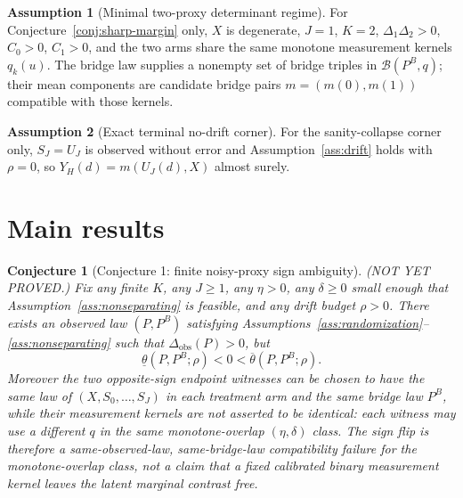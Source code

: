 \documentclass[11pt]{article}
\theoremstyle{definition}
\newtheorem{assumption}{Assumption}
\theoremstyle{plain}
\newtheorem{conjecture}{Conjecture}
\theoremstyle{remark}
\begin{document}
\begin{assumption}[Minimal two-proxy determinant regime]\label{ass:determinant-regime}
For Conjecture~\ref{conj:sharp-margin} only, \(X\) is degenerate, \(J=1\), \(K=2\), \(\Delta_1\Delta_2>0\), \(C_0>0\), \(C_1>0\), and the two arms share the same monotone measurement kernels \(q_k(u)\).  The bridge law supplies a nonempty set of bridge triples in \(\mathcal{B}(P^B,q)\); their mean components are candidate bridge pairs \(m=(m(0),m(1))\) compatible with those kernels.
\end{assumption}

\begin{assumption}[Exact terminal no-drift corner]\label{ass:exact-corner}
For the sanity-collapse corner only, \(S_J=U_J\) is observed without error and Assumption~\ref{ass:drift} holds with \(\rho=0\), so \(Y_H(d)=m(U_J(d),X)\) almost surely.
\end{assumption}

\section{Main results}
\begin{conjecture}[Conjecture 1: finite noisy-proxy sign ambiguity]\label{conj:finite-proxy-sign-ambiguity}
(NOT YET PROVED.)  Fix any finite \(K\), any \(J\ge1\), any \(\eta>0\), any \(\delta\ge0\) small enough that Assumption~\ref{ass:nonseparating} is feasible, and any drift budget \(\rho>0\).  There exists an observed law \((P,P^B)\) satisfying Assumptions~\ref{ass:randomization}--\ref{ass:nonseparating} such that \(\Delta_{\mathrm{obs}}(P)>0\), but
\[
  \underline\theta(P,P^B;\rho)<0<\overline\theta(P,P^B;\rho).
\]
Moreover the two opposite-sign endpoint witnesses can be chosen to have the same law of \((X,S_0,\ldots,S_J)\) in each treatment arm and the same bridge law \(P^B\), while their measurement kernels are not asserted to be identical: each witness may use a different \(q\) in the same monotone-overlap \((\eta,\delta)\) class.  The sign flip is therefore a same-observed-law, same-bridge-law compatibility failure for the monotone-overlap class, not a claim that a fixed calibrated binary measurement kernel leaves the latent marginal contrast free.
\end{conjecture}
\end{document}

